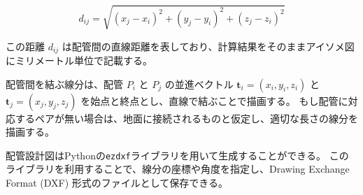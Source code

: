 \[
d_{ij} = \sqrt{(x_j - x_i)^2 + (y_j - y_i)^2 + (z_j - z_i)^2}
\]

この距離 $d_{ij}$ は配管間の直線距離を表しており、計算結果をそのままアイソメ図にミリメートル単位で記載する。

配管間を結ぶ線分は、配管 $P_i$ と $P_j$ の並進ベクトル $\mathbf{t}_i = (x_i, y_i, z_i)$ と $\mathbf{t}_j = (x_j, y_j, z_j)$ を始点と終点とし、直線で結ぶことで描画する。
もし配管に対応するペアが無い場合は、地面に接続されるものと仮定し、適切な長さの線分を描画する。

配管設計図はPythonの\texttt{ezdxf}ライブラリを用いて生成することができる。
このライブラリを利用することで、線分の座標や角度を指定し、Drawing Exchange Format (DXF) 形式のファイルとして保存できる。
